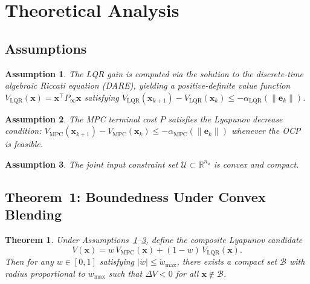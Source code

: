 \documentclass[journal]{IEEEtran}
\newtheorem{theorem}{Theorem}
\newtheorem{assumption}{Assumption}
\newcommand{\R}{\mathbb{R}}
\newcommand{\abs}[1]{\left\lvert#1\right\rvert}
\begin{document}
\section{Theoretical Analysis}\label{sec:theory}

\subsection{Assumptions}

\begin{assumption}\label{ass:lqr}
  The LQR gain is computed via the solution to the discrete-time algebraic
  Riccati equation (DARE), yielding a positive-definite value function
  \(V_{\mathrm{LQR}}(\mathbf{x}) = \mathbf{x}^\top P_\infty \mathbf{x}\)
  satisfying
  \(V_{\mathrm{LQR}}(\mathbf{x}_{k+1}) - V_{\mathrm{LQR}}(\mathbf{x}_k) \leq
  -\alpha_{\mathrm{LQR}}(\|\mathbf{e}_k\|)\).
\end{assumption}

\begin{assumption}\label{ass:mpc}
  The MPC terminal cost \(P\) satisfies the Lyapunov decrease condition:
  \(V_{\mathrm{MPC}}(\mathbf{x}_{k+1}) - V_{\mathrm{MPC}}(\mathbf{x}_k) \leq
  -\alpha_{\mathrm{MPC}}(\|\mathbf{e}_k\|)\) whenever the OCP is feasible.
\end{assumption}

\begin{assumption}\label{ass:input}
  The joint input constraint set \(\mathcal{U}\subset\R^{n_u}\) is convex and
  compact.
\end{assumption}

\subsection{Theorem~1: Boundedness Under Convex Blending}

\begin{theorem}\label{thm:lyapunov}
  Under Assumptions~\ref{ass:lqr}--\ref{ass:input}, define the composite
  Lyapunov candidate
  \begin{equation}
    V(\mathbf{x}) = w\,V_{\mathrm{MPC}}(\mathbf{x}) +
                   (1-w)\,V_{\mathrm{LQR}}(\mathbf{x}).
  \end{equation}
  Then for any \(w \in [0,1]\) satisfying \(\abs{\dot{w}} \leq \dot{w}_{\max}\),
  there exists a compact set \(\mathcal{B}\) with radius proportional to
  \(\dot{w}_{\max}\) such that
  \(\Delta V < 0\) for all \(\mathbf{x} \notin \mathcal{B}\).
\end{theorem}
\end{document}
